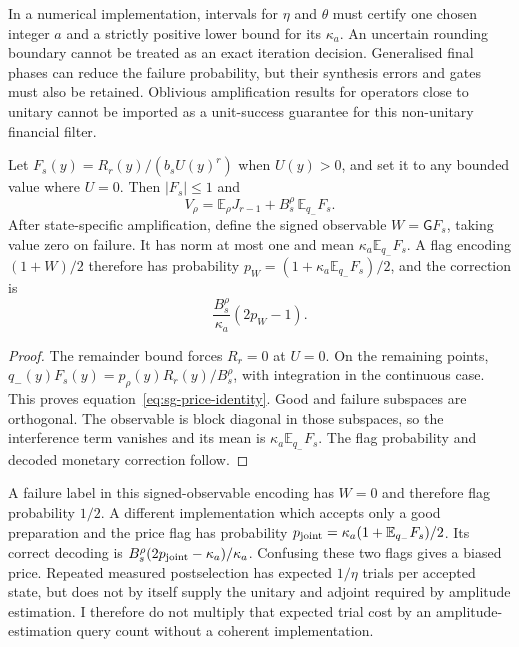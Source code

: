 In a numerical implementation, intervals for $\eta$ and $\theta$ must
certify one chosen integer $a$ and a strictly positive lower bound
for its $\kappa_a$. An uncertain rounding boundary cannot be treated
as an exact iteration decision. Generalised final phases can reduce
the failure probability, but their synthesis errors and gates must
also be retained. Oblivious amplification results for operators close
to unitary cannot be imported as a unit-success guarantee for this
non-unitary financial filter.

\begin{proposition}
\label{prop:sg-coherent-correction}
Let $F_s(y)=R_r(y)/(b_sU(y)^r)$ when $U(y)>0$, and set it to any
bounded value where $U=0$. Then $|F_s|\leq1$ and
\begin{equation}
 V_\rho=\mathbb E_\rho J_{r-1}
                    +B_s^\rho\,\mathbb E_{q_-}F_s.
 \label{eq:sg-price-identity}
\end{equation}
After state-specific amplification, define the signed observable
$W=\mathsf G F_s$, taking value zero on failure. It has norm at most
one and mean $\kappa_a\mathbb E_{q_-}F_s$. A flag encoding
$(1+W)/2$ therefore has probability
$p_W=(1+\kappa_a\mathbb E_{q_-}F_s)/2$, and the correction is
\begin{equation}
 \frac{B_s^\rho}{\kappa_a}(2p_W-1).
 \label{eq:sg-kappa-correction}
\end{equation}
\end{proposition}
\begin{proof}
The remainder bound forces $R_r=0$ at $U=0$. On the remaining
points, $q_-(y)F_s(y)=p_\rho(y)R_r(y)/B_s^\rho$, with integration
in the continuous case. This proves
equation~\eqref{eq:sg-price-identity}. Good and failure subspaces are
orthogonal. The observable is block diagonal in those subspaces,
so the interference term vanishes and its mean is
$\kappa_a\mathbb E_{q_-}F_s$. The flag probability and decoded
monetary correction follow.
\end{proof}

A failure label in this signed-observable encoding has $W=0$ and
therefore flag probability $1/2$. A different implementation which
accepts only a good preparation and the price flag has probability
$p_{\rm joint}=\kappa_a(1+\mathbb E_{q_-}F_s)/2$. Its correct
decoding is $B_s^\rho(2p_{\rm joint}-\kappa_a)/\kappa_a$.
Confusing these two flags gives a biased price.
Repeated measured postselection has expected $1/\eta$ trials per
accepted state, but does not by itself supply the unitary and adjoint
required by amplitude estimation. I therefore do not multiply that
expected trial cost by an amplitude-estimation query count without
a coherent implementation.

